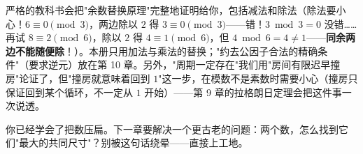 \begin{chengshi}
严格的教科书会把"余数替换原理"完整地证明给你，包括减法和除法（除法要小心！$6 \equiv 0 \pmod 3$，两边除以 $2$ 得 $3 \equiv 0 \pmod 3$——错！$3 \bmod 3 = 0$ 没错……再试 $8 \equiv 2 \pmod 6$，除以 $2$ 得 $4 \equiv 1 \pmod 6$，但 $4 \bmod 6 = 4 \ne 1$——\textbf{同余两边不能随便除}！）。本册只用加法与乘法的替换；"约去公因子合法的精确条件"（要求逆元）放在第 10 章。另外，"周期一定存在"我们用"房间有限迟早撞房"论证了，但"撞房就意味着回到 $1$"这一步，在模数不是素数时需要小心（撞房只保证回到某个循环，不一定从 $1$ 开始）——第 9 章的拉格朗日定理会把这件事一次说透。
\end{chengshi}

你已经学会了把数压扁。下一章要解决一个更古老的问题：两个数，怎么找到它们"最大的共同尺寸"？别被这句话绕晕——直接上工地。
